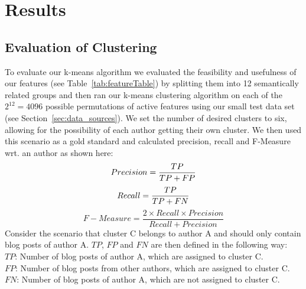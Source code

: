 \section{Results}
\label{sec:results}


\subsection{Evaluation of Clustering}
\label{sec:evaluation_clustering}
To evaluate our k-means algorithm we evaluated the feasibility and usefulness of our features (see Table~\ref{tab:featureTable}) by splitting them into 12 semantically related groups and then ran our k-means clustering algorithm on each of the $2^{12} = 4096$ possible permutations of active features using our small test data set (see Section~\ref{sec:data_sources}).
We set the number of desired clusters to six, allowing for the possibility of each author getting their own cluster.
We then used this scenario as a gold standard and calculated precision, recall and F-Measure wrt. an author as shown here:
\begin{equation}
	Precision = \frac{TP}{TP + FP} \\
	\label{eq:precision}
\end{equation}
\begin{equation}
	Recall = \frac{TP}{TP + FN} \\
	\label{eq:recall}
\end{equation}
\begin{equation}
	F-Measure = \frac{2 \times Recall \times Precision}{Recall + Precision}
	\label{eq:fMeasure}
\end{equation}
Consider the scenario that cluster C belongs to author A and should only contain blog posts of author A.
$TP$, $FP$ and $FN$ are then defined in the following way: \\
$TP$: Number of blog posts of author A, which are assigned to cluster C. \\
$FP$: Number of blog posts from other authors, which are assigned to cluster C. \\
$FN$: Number of blog posts of author A, which are not assigned to cluster C.


